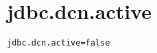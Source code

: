 \section{jdbc.dcn.active}
\label{configuration:JdbcDcnActive}
\ClearAPI
\TODO
{}
\begin{lstlisting}[style=Props,caption={Usage example for \textit{jdbc.dcn.active}}]
jdbc.dcn.active=false
\end{lstlisting}